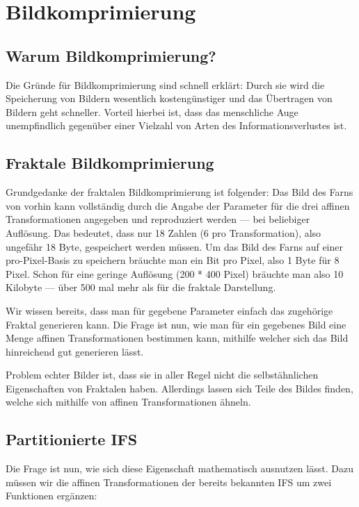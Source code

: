 \documentclass[afourpaper]{latex-classes/handout}
\begin{document}
\section{Bildkomprimierung}

\subsection{Warum Bildkomprimierung?}

Die Gründe für Bildkomprimierung sind schnell erklärt: Durch sie wird die Speicherung von Bildern wesentlich kostengünstiger und das Übertragen von Bildern geht schneller. Vorteil hierbei ist, dass das menschliche Auge unempfindlich gegenüber einer Vielzahl von Arten des Informationsverlustes ist.

\subsection{Fraktale Bildkomprimierung}

Grundgedanke der fraktalen Bildkomprimierung ist folgender: Das Bild des Farns von vorhin kann vollständig durch die Angabe der Parameter für die drei affinen Transformationen angegeben und reproduziert werden --- bei beliebiger Auflösung. Das bedeutet, dass nur 18 Zahlen (6 pro Transformation), also ungefähr 18 Byte, gespeichert werden müssen. Um das Bild des Farns auf einer pro-Pixel-Basis zu speichern bräuchte man ein Bit pro Pixel, also 1 Byte für 8 Pixel. Schon für eine geringe Auflösung (200 * 400 Pixel) bräuchte man also 10 Kilobyte --- über 500 mal mehr als für die fraktale Darstellung.

Wir wissen bereits, dass man für gegebene Parameter einfach das zugehörige Fraktal generieren kann. Die Frage ist nun, wie man für ein gegebenes Bild eine Menge affinen Transformationen bestimmen kann, mithilfe welcher sich das Bild hinreichend gut generieren lässt.

Problem echter Bilder ist, dass sie in aller Regel nicht die selbstähnlichen Eigenschaften von Fraktalen haben. Allerdings lassen sich Teile des Bildes finden, welche sich mithilfe von affinen Transformationen ähneln.

\subsection{Partitionierte IFS}

Die Frage ist nun, wie sich diese Eigenschaft mathematisch ausnutzen lässt. Dazu müssen wir die affinen Transformationen der bereits bekannten IFS um zwei Funktionen ergänzen:
\end{document}
